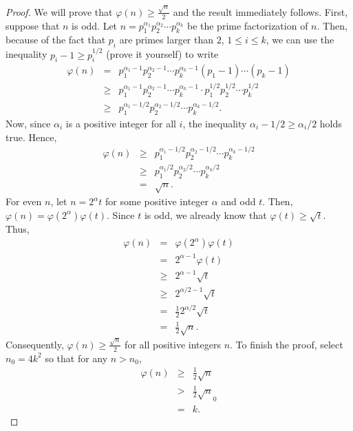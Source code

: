 \documentclass[12pt]{subfile}
\begin{document}
		\begin{proof}
			We will prove that $\varphi(n) \geq \frac{\sqrt{n}}{2}$ and the result immediately follows. First, suppose that $n$ is odd. Let $n=p_1^{\alpha_1} p_2^{\alpha_2} \cdots p_k^{\alpha_k}$ be the prime factorization of $n$. Then, because of the fact that $p_i$ are primes larger than $2$, $1 \leq i \leq k$, we can use the inequality $p_i-1 \geq p_i^{1/2}$ (prove it yourself) to write
				\begin{eqnarray*}
					\varphi(n) &=& p_1^{\alpha_1-1} p_2^{\alpha_2-1} \cdots p_k^{\alpha_k-1} \left( p_1 -1 \right) \cdots \left( p_k -1 \right)\\
							   &\geq& p_1^{\alpha_1-1} p_2^{\alpha_2-1} \cdots p_k^{\alpha_k-1} \cdot p_1^{1/2} p_2^{1/2} \cdots p_k^{1/2}\\
							   &\geq& p_1^{\alpha_1-1/2} p_2^{\alpha_2-1/2} \cdots p_k^{\alpha_k-1/2}.
				\end{eqnarray*}
			Now, since $\alpha_i$ is a positive integer for all $i$, the inequality $\alpha_i - 1/2 \geq \alpha_i/2$ holds true. Hence,
				\begin{eqnarray*}
					\varphi(n)  &\geq& p_1^{\alpha_1-1/2} p_2^{\alpha_2-1/2} \cdots p_k^{\alpha_k-1/2}\\
								&\geq& p_1^{\alpha_1/2} p_2^{\alpha_2/2} \cdots p_k^{\alpha_k/2}\\
								&=& \sqrt n.
				\end{eqnarray*}
			For even $n$, let $n=2^\alpha t$ for some positive integer $\alpha$ and odd $t$. Then, $\varphi(n)=\varphi(2^\alpha)\varphi(t)$. Since $t$ is odd, we already know that $\varphi(t) \geq \sqrt t$. Thus,
				\begin{eqnarray*}
					\varphi(n) &=& \varphi(2^\alpha)\varphi(t)\\
							   &=& 2^{\alpha -1} \varphi(t)\\
							   &\geq& 2^{\alpha -1} \sqrt t\\
							   &\geq& 2^{\alpha/2 -1} \sqrt t\\
							   &=& \frac{1}{2}2^{\alpha/2} \sqrt t\\
							   &=& \frac{1}{2} \sqrt n.
				\end{eqnarray*}
			Consequently, $\varphi(n) \geq \frac{\sqrt n}{2}$ for all positive integers $n$. To finish the proof, select $n_0=4k^2$ so that for any $n>n_0$,
				\begin{eqnarray*}
					\varphi(n) &\geq& \frac{1}{2} \sqrt n\\
							   &>& \frac{1}{2} \sqrt n_0\\
							   &=& k.
				\end{eqnarray*}
		\end{proof}
\end{document}
